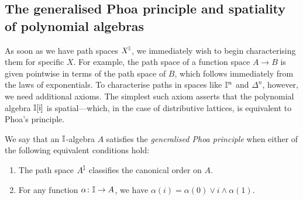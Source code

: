 \subsection{The generalised Phoa principle and spatiality of polynomial algebras}

As soon as we have path spaces $X^{\mathbb{I}}$, we immediately wish to begin characterising them for specific $X$. For example, the path space of a function space $A\to B$ is given pointwise in terms of the path space of $B$, which follows immediately from the laws of exponentials. To characterise paths in spaces like $\mathbb{I}^n$ and $\Delta^n$, however, we need additional axioms. The simplest such axiom asserts that the polynomial algebra $\mathbb{I}[\mathsf{i}]$ is spatial---which, in the case of distributive lattices, is equivalent to Phoa's principle.

\begin{definition}\label{def:gen-phoa}
  We say that an $\mathbb{I}$-algebra $A$ satisfies the \emph{generalised Phoa principle} when either of the following equivalent conditions hold:
  \begin{enumerate}
    \item The path space $A^{\mathbb{I}}$ classifies the canonical order on $A$.
    \item For any function $\alpha\colon \mathbb{I}\to A$, we have $\alpha(i) = \alpha(0)\vee i \wedge \alpha(1)$.
  \end{enumerate}
\end{definition}

